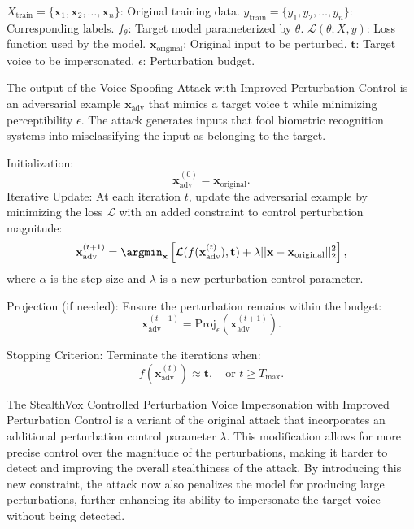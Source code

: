 $X_{\text{train}} = \{\mathbf{x}_1, \mathbf{x}_2, \ldots, \mathbf{x}_n\}$: Original training data.
$y_{\text{train}} = \{y_1, y_2, \ldots, y_n\}$: Corresponding labels.
$f_\theta$: Target model parameterized by $\theta$.
$\mathcal{L}(\theta; X, y)$: Loss function used by the model.
$\mathbf{x}_{\text{original}}$: Original input to be perturbed.
$\mathbf{t}$: Target voice to be impersonated.
$\epsilon$: Perturbation budget.

The output of the Voice Spoofing Attack with Improved Perturbation Control is an adversarial example $\mathbf{x}_{\text{adv}}$ that mimics a target voice $\mathbf{t}$ while minimizing perceptibility $\epsilon$. The attack generates inputs that fool biometric recognition systems into misclassifying the input as belonging to the target.


Initialization:
    \[
    \mathbf{x}_{\text{adv}}^{(0)} = \mathbf{x}_{\text{original}}.
    \]
Iterative Update:
    At each iteration $t$, update the adversarial example by minimizing the loss $\mathcal{L}$ with an added constraint to control perturbation magnitude:
    \[
    \mathbf{x}_{\text{adv}}^{(t+1)} = \argmin_{\mathbf{x}} \left[ \mathcal{L}(f(\mathbf{x}_{\text{adv}}^{(t)}), \mathbf{t}) + \lambda ||\mathbf{x} - \mathbf{x}_{\text{original}}||_2^2 \right],
    \]
    where $\alpha$ is the step size and $\lambda$ is a new perturbation control parameter.

Projection (if needed):
    Ensure the perturbation remains within the budget:
    \[
    \mathbf{x}_{\text{adv}}^{(t+1)} = \text{Proj}_\epsilon(\mathbf{x}_{\text{adv}}^{(t+1)}).
    \]

Stopping Criterion:
    Terminate the iterations when:
    \[
    f(\mathbf{x}_{\text{adv}}^{(t)}) \approx \mathbf{t}, \quad \text{or } t \geq T_{\text{max}}.
    \]

The StealthVox Controlled Perturbation Voice Impersonation with Improved Perturbation Control is a variant of the original attack that incorporates an additional perturbation control parameter $\lambda$. This modification allows for more precise control over the magnitude of the perturbations, making it harder to detect and improving the overall stealthiness of the attack. By introducing this new constraint, the attack now also penalizes the model for producing large perturbations, further enhancing its ability to impersonate the target voice without being detected.